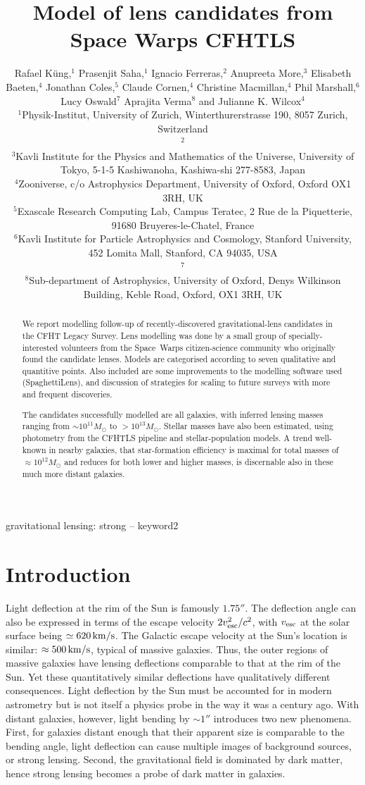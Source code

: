 \documentclass[fleqn,usenatbib]{mnras}
\title[Short title, max. 45 characters]{Model of lens candidates from
  Space Warps CFHTLS}
\author[Küng et al]{Rafael Küng,$^{1}$
Prasenjit Saha,$^{1}$
Ignacio Ferreras,$^{2}$
Anupreeta More,$^{3}$
Elisabeth Baeten,$^{4}$
\newauthor
Jonathan Coles,$^{5}$
Claude Cornen,$^{4}$
Christine Macmillan,$^{4}$
Phil Marshall,$^{6}$ 
Lucy Oswald$^{7}$
\newauthor
Aprajita Verma$^{8}$
and Julianne K. Wilcox$^{4}$
%
\\
%
$^{1}$Physik-Institut, University of Zurich, Winterthurerstrasse 190, 8057 Zurich, Switzerland\\
$^{2}$\\
$^{3}$Kavli Institute for the Physics and Mathematics of the Universe, University of Tokyo, 5-1-5 Kashiwanoha, Kashiwa-shi 277-8583, Japan\\
$^{4}$Zooniverse, c/o Astrophysics Department, University of Oxford, Oxford OX1 3RH, UK \\
$^{5}$Exascale Research Computing Lab, Campus Teratec, 2 Rue de la Piquetterie, 91680 Bruyeres-le-Chatel, France\\
$^{6}$Kavli Institute for Particle Astrophysics and Cosmology, Stanford University, 452 Lomita Mall, Stanford, CA 94035, USA\\
$^{7}$\\
$^{8}$Sub-department of Astrophysics, University of Oxford, Denys Wilkinson Building, Keble Road, Oxford, OX1 3RH, UK\\
}
\begin{document}
\label{firstpage}
\pagerange{\pageref{firstpage}--\pageref{lastpage}}
\maketitle

\begin{abstract}
We report modelling follow-up of recently-discovered
gravitational-lens candidates in the CFHT Legacy Survey.  Lens
modelling was done by a small group of specially-interested volunteers
from the Space~Warps citizen-science community who originally found
the candidate lenses.  Models are categorised according to seven
qualitative and quantitive points.  Also included are some
improvements to the modelling software used (SpaghettiLens),
and discussion of strategies for scaling to future surveys
with more and frequent discoveries.

The candidates successfully modelled are all galaxies, with inferred
lensing masses ranging from $\sim10^{11}M_\odot$ to $>10^{13}M_\odot$.
Stellar masses have also been estimated, using photometry from the
CFHTLS pipeline and stellar-population models.  A trend well-known
in nearby galaxies, that star-formation efficiency is maximal for
total masses of $\approx10^{12}M_\odot$ and reduces for both lower and
higher masses, is discernable also in these much more distant
galaxies.
\end{abstract}

\begin{keywords}
gravitational lensing: strong -- keyword2
\end{keywords}

\section{Introduction}

Light deflection at the rim of the Sun is famously $1.75''$.  The
deflection angle can also be expressed in terms of the escape velocity
$2v_{\rm esc}^2/c^2$, with $v_{\rm esc}$ at the solar surface being
$\simeq620\rm\,km/s$.  The Galactic escape velocity at the Sun's
location is similar: $\approx500\rm\,km/s$, typical of massive
galaxies.  Thus, the outer regions of massive galaxies have lensing
deflections comparable to that at the rim of the Sun.  Yet these
quantitatively similar deflections have qualitatively different
consequences.  Light deflection by the Sun must be accounted for in
modern astrometry \citep[see e.g.,][]{2015CQGra..32p5008C} but is not
itself a physics probe in the way it was a century ago.  With distant
galaxies, however, light bending by $\sim1''$ introduces two new
phenomena.  First, for galaxies distant enough that their apparent
size is comparable to the bending angle, light deflection can cause
multiple images of background sources, or strong lensing.  Second, the
gravitational field is dominated by dark matter, hence strong lensing
becomes a probe of dark matter in galaxies.
\end{document}
